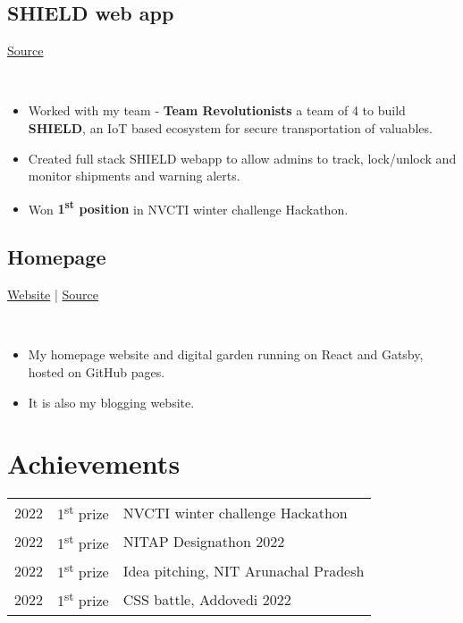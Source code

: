 \documentclass[]{article}
\newcommand{\subheading}[2]{
  {\subsection{#1}
  \hfill \normalsize#2} \\
  \vspace{2pt}
}
\newenvironment{tightemize}{
\vspace{-\topsep}\begin{itemize}\itemsep1pt \parskip0pt \parsep0pt}
{\end{itemize}\vspace{-\topsep}}
\begin{document}
\begin{multicols}{2}
\begin{flushleft}
    \subheading{SHIELD web app}{\href{https://github.com/tripathics}{Source}}
    \begin{tightemize}
      \item Worked with my team - \textbf{Team Revolutionists} a team of 4 to build \textbf{SHIELD}, an IoT based ecosystem for secure transportation of valuables.
      \item Created full stack SHIELD webapp to allow admins to track, lock/unlock and monitor shipments and warning alerts.
      \item Won \textbf{1\textsuperscript{st} position} in NVCTI winter challenge Hackathon.
    \end{tightemize}

    \subheading{Homepage}{
      \href{https://tripathics.github.io}{Website} | 
      \href{https://github.com/tripathics/tripathics.githbu.io/tree/src}{Source} 
    }
    \begin{tightemize}
      \item My homepage website and digital garden running on React and Gatsby, hosted on GitHub pages.
      \item It is also my blogging website. 
    \end{tightemize}

    
    \section{Achievements}
    \begin{tabular}{rll}
      2022 & 1\textsuperscript{st} prize & NVCTI winter challenge Hackathon\\
      2022 & 1\textsuperscript{st} prize & NITAP Designathon 2022\\
      2022 & 1\textsuperscript{st} prize & Idea pitching, NIT Arunachal Pradesh\\
      2022 & 1\textsuperscript{st} prize & CSS battle, Addovedi 2022\\
    \end{tabular}

  \end{flushleft}
\end{multicols}
\end{document}
